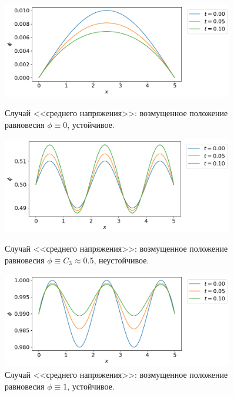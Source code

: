 \begin{figure}[!tp]
	\centering
	\includegraphics[width=0.9\textwidth]{figures/equilibrium_2_0.png}
	\vspace{-0.3cm}
	\caption{Случай <<среднего напряжения>>: возмущенное положение равновесия $\phi \equiv 0$, устойчивое.}
	\label{fig:equilibrium_2_0}
	\vspace{0.5cm}

	\includegraphics[width=0.9\textwidth]{figures/equilibrium_2_05.png}
	\vspace{-0.3cm}
	\caption{Случай <<среднего напряжения>>: возмущенное положение равновесия $\phi \equiv C_3 \approx 0.5$, неустойчивое.}
	\label{fig:equilibrium_2_05}
	\vspace{0.5cm}
	
	\includegraphics[width=0.9\textwidth]{figures/equilibrium_2_1.png}
	\vspace{-0.3cm}
	\caption{Случай <<среднего напряжения>>: возмущенное положение равновесия $\phi \equiv 1$, устойчивое.}
	\label{fig:equilibrium_2_1}
\end{figure}

